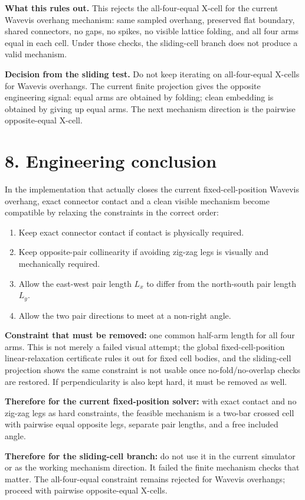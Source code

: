 \documentclass[11pt,letterpaper]{article}
\begin{document}
\textbf{What this rules out.} This rejects the all-four-equal X-cell for the current Wavevis overhang mechanism: same sampled overhang, preserved flat boundary, shared connectors, no gaps, no spikes, no visible lattice folding, and all four arms equal in each cell. Under those checks, the sliding-cell branch does not produce a valid mechanism.

\textbf{Decision from the sliding test.} Do not keep iterating on all-four-equal X-cells for Wavevis overhangs. The current finite projection gives the opposite engineering signal: equal arms are obtained by folding; clean embedding is obtained by giving up equal arms. The next mechanism direction is the pairwise opposite-equal X-cell.

\section*{8. Engineering conclusion}

In the implementation that actually closes the current fixed-cell-position Wavevis overhang, exact connector contact and a clean visible mechanism become compatible by relaxing the constraints in the correct order:

\begin{enumerate}
  \item Keep exact connector contact if contact is physically required.
  \item Keep opposite-pair collinearity if avoiding zig-zag legs is visually and mechanically required.
  \item Allow the east-west pair length \(L_x\) to differ from the north-south pair length \(L_y\).
  \item Allow the two pair directions to meet at a non-right angle.
\end{enumerate}

\textbf{Constraint that must be removed:} one common half-arm length for all four arms. This is not merely a failed visual attempt; the global fixed-cell-position linear-relaxation certificate rules it out for fixed cell bodies, and the sliding-cell projection shows the same constraint is not usable once no-fold/no-overlap checks are restored. If perpendicularity is also kept hard, it must be removed as well.

\textbf{Therefore for the current fixed-position solver:} with exact contact and no zig-zag legs as hard constraints, the feasible mechanism is a two-bar crossed cell with pairwise equal opposite legs, separate pair lengths, and a free included angle.

\textbf{Therefore for the sliding-cell branch:} do not use it in the current simulator or as the working mechanism direction. It failed the finite mechanism checks that matter. The all-four-equal constraint remains rejected for Wavevis overhangs; proceed with pairwise opposite-equal X-cells.
\end{document}
